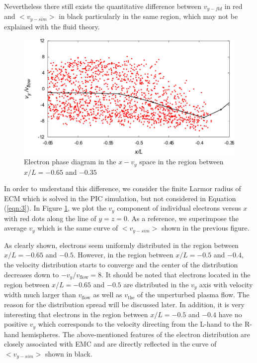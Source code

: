 \documentclass[draft,jgrga]{agutex2015}
\begin{document}
\begin{article}
Nevertheless there still exists the quantitative difference between 
$v_{y-fld}$ in red and $<v_{y-sim}>$ in black
particularly in the same region, 
which may not be explained with the fluid theory.
\begin{figure}
\centering
\noindent\includegraphics[width=15cm]{./figures/Fig_9_bb-crop.pdf}
\caption{
Electron phase diagram in the $x-v_{y}$ space in the region between $x/L =-0.65$ and $-0.35$
}
\label{fig:9}
\end{figure}
In order to understand this difference, 
we consider the finite Larmor radius of ECM 
which is solved in the PIC simulation, 
but not considered in Equation (\ref{eqn:3}).
In Figure \ref{fig:9}, 
we plot the $v_y$ component of individual electrons versus $x$ with red dots
along the line of $y=z=0$.
As a reference, 
we superimpose the average $v_y$ which is the same curve of $<v_{y-sim}>$ 
shown in the previous figure.
%
%
%

As clearly shown, 
electrons seem uniformly distributed 
in the region between $x/L =-0.65$ and $-0.5$.
However, in the region between $x/L =-0.5$ and $-0.4$, 
the velocity distribution starts to converge 
and the center of the distribution decreases down to $-v_y/v_{\mathrm{flow}}=8$. 
It should be noted that 
electrons located in the region between $x/L =-0.65$ and $-0.5$
are distributed in the $v_y$ axis with velocity width much larger 
than $v_{\mathrm{flow}}$ as well as $v_{\mathrm{the}}$ of the unperturbed plasma flow. 
The reason for the distribution spread will be discussed later.
In addition, it is very interesting that electrons
in the region between $x/L =-0.5$ and $-0.4$
have no positive $v_y$ which corresponds to the velocity directing 
from the L-hand to the R-hand hemispheres.
The above-mentioned features of the electron distribution are closely
associated with EMC 
and are directly reflected in the curve of $<v_{y-sim}>$ shown in black.


\end{article}
\end{document}
